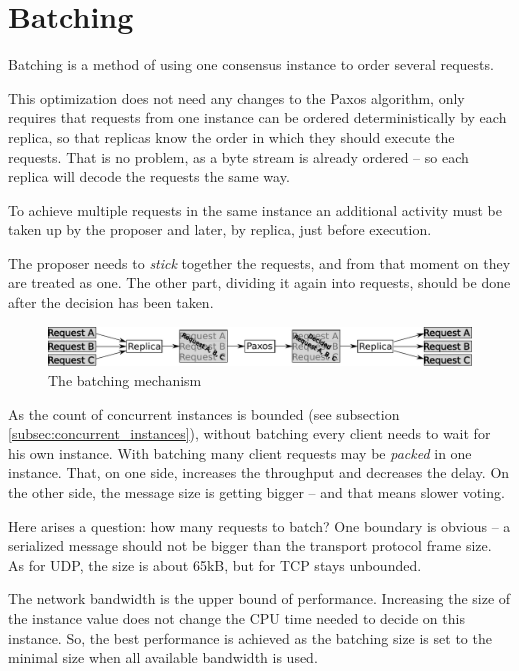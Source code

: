 \section{Batching}
\label{sec:batching}
Batching is a method of using one consensus instance to order several requests.

This optimization does not need any changes to the Paxos algorithm, only requires that requests from one instance can be ordered deterministically by each replica, so that replicas know the order in which they should execute the requests. That is no problem, as a byte stream is already ordered -- so each replica will decode the requests the same way.

To achieve multiple requests in the same instance an additional activity must be taken up by the proposer and later, by replica, just before execution.

The proposer needs to \textit{stick} together the requests, and from that moment on they are treated as one. The other part, dividing it again into requests, should be done after the decision has been taken.
\begin{figure}[h]
\includegraphics[keepaspectratio, width=\textwidth]{features/batching.pdf}
\vspace{-1em}
\caption{The batching mechanism}
\vspace{-1em}
\end{figure}

As the count of concurrent instances is bounded (see subsection \ref{subsec:concurrent_instances}), without batching every client needs to wait for his own instance. With batching many client requests may be \textit{packed} in one instance. That, on one side, increases the throughput and decreases the delay.
On the other side, the message size is getting bigger -- and that means slower voting.

Here arises a question: how many requests to batch? One boundary is obvious -- a serialized message should not be bigger than the transport protocol frame size. As for UDP, the size is about 65kB, but for TCP stays unbounded.

The network bandwidth is the upper bound of performance. Increasing the size of the instance value does not change the CPU time needed to decide on this instance. So, the best performance is achieved as the batching size is set to the minimal size when all available bandwidth is used.

